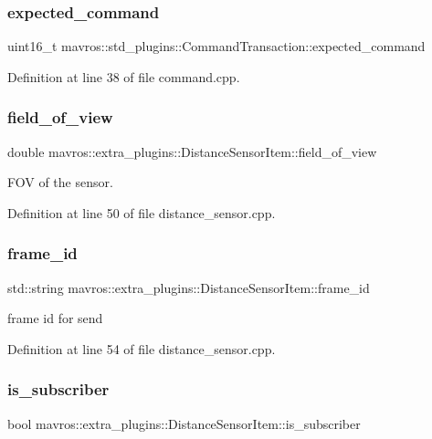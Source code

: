 \subsubsection{\texorpdfstring{expected\_command}{expected\_command}}
{\footnotesize\ttfamily uint16\+\_\+t mavros\+::std\+\_\+plugins\+::\+Command\+Transaction\+::expected\+\_\+command}



Definition at line 38 of file command.\+cpp.

\mbox{\label{group__plugin_ga347b13757e45e5125842a118c43ef74a}} 
\subsubsection{\texorpdfstring{field\_of\_view}{field\_of\_view}}
{\footnotesize\ttfamily double mavros\+::extra\+\_\+plugins\+::\+Distance\+Sensor\+Item\+::field\+\_\+of\+\_\+view}



F\+OV of the sensor. 



Definition at line 50 of file distance\+\_\+sensor.\+cpp.

\mbox{\label{group__plugin_ga6b41efde5ba3e2b5822233811dd45997}} 
\subsubsection{\texorpdfstring{frame\_id}{frame\_id}}
{\footnotesize\ttfamily std\+::string mavros\+::extra\+\_\+plugins\+::\+Distance\+Sensor\+Item\+::frame\+\_\+id}



frame id for send 



Definition at line 54 of file distance\+\_\+sensor.\+cpp.

\mbox{\label{group__plugin_ga51a4de10631a84721596038771ef77ea}} 
\subsubsection{\texorpdfstring{is\_subscriber}{is\_subscriber}}
{\footnotesize\ttfamily bool mavros\+::extra\+\_\+plugins\+::\+Distance\+Sensor\+Item\+::is\+\_\+subscriber}



